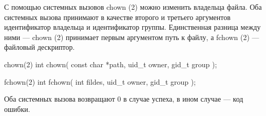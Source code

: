С помощью системных вызовов chown (2) можно изменить владельца файла. Оба системных вызова принимают в качестве второго и третьего аргументов идентификатор владельца и идентификатор группы. Единственная разница между ними --- chown (2) принимает первым аргументом путь к файлу, а fchown (2) --- файловый дескриптор.

\begin{CCode}{chown(2)}
	int chown(
		const char *path, 
		uid_t owner,
		gid_t group
	); \end{CCode}

\begin{CCode}{fchown(2)}
	int fchown(
		int fildes, 
		uid_t owner,
		gid_t group
); \end{CCode}

Оба системных вызова возвращают 0 в случае успеха, в ином случае --- код ошибки.
